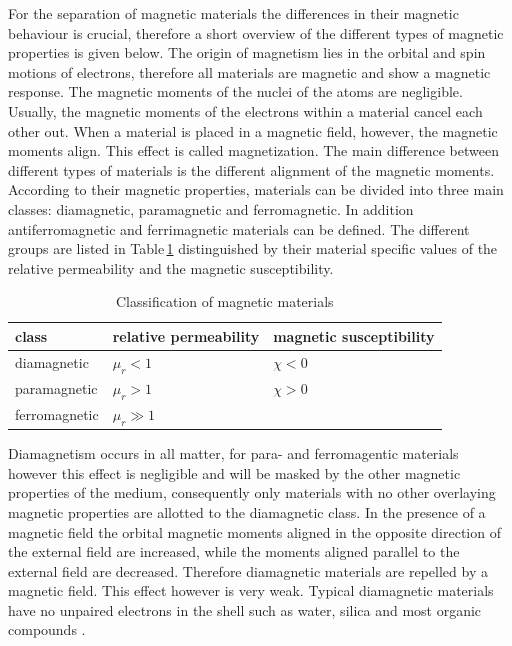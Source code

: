 For the separation of magnetic materials the differences in their magnetic behaviour is crucial, therefore a short overview of the different types of magnetic properties is given below. The origin of magnetism lies in the orbital and spin motions of electrons, therefore all materials are magnetic and show a magnetic response. The magnetic moments of the nuclei of the atoms are negligible. Usually,  the magnetic moments of the electrons within a material cancel each other out. When a material is placed in a magnetic field, however, the magnetic moments align. This effect is called magnetization. The main difference between different types of materials is the different alignment of the magnetic moments. According to their magnetic properties, materials can be divided into three main classes: diamagnetic, paramagnetic and ferromagnetic. In addition antiferromagnetic and ferrimagnetic materials can be defined. The different groups are listed in Table\,\ref{table:mag_material} distinguished by their material specific values of the relative permeability and the magnetic susceptibility. 

\begin{table}[H]
\centering
\caption{Classification of magnetic materials}
\label{table:mag_material}
\begin{tabular}{lll}\hline
class & relative permeability & magnetic susceptibility \\
\hline\hline
diamagnetic & $\mu_{r}<1$ & $\chi<0$ \\
paramagnetic & $\mu_{r}>1$ & $\chi>0$ \\
ferromagnetic & $\mu_{r}\gg1$ &  \\
\hline
\end{tabular}
\end{table}

Diamagnetism occurs in all matter, for para- and ferromagentic materials however this effect is negligible and will be masked by the other magnetic properties of the medium, consequently only materials with no other overlaying magnetic properties are allotted to the diamagnetic class. In the presence of a magnetic field the orbital magnetic moments aligned in the opposite direction of the external field are increased, while the moments aligned parallel to the external field are decreased. Therefore diamagnetic materials are repelled by a magnetic field. This effect however is very weak. Typical diamagnetic materials have no unpaired electrons in the shell such as water, silica and most organic compounds \cite{svoboda2004magnetic,griffiths2011elektrodynamik}.

